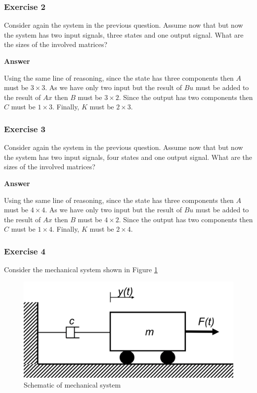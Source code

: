 \subsubsection{Exercise 2}

Consider again the system in the previous  question. Assume now that but now the system has two input signals, three states and one output signal. What are the sizes of the involved matrices?

\textbf{Answer}

Using the same line of reasoning, since the state has three components then $A$ must be $3\times 3$. As we have only two input but the result of $Bu$ must be added to the result of $Ax$ then $B$ must be $3\times 2$. Since the output has two components then $C$ must be $1\times 3$. Finally, $K$ must be $2\times 3$.

\subsubsection{Exercise 3}

Consider again the system in the previous  question. Assume now that but now the system has two input signals, four states and one output signal. What are the sizes of the involved matrices?

\textbf{Answer}

Using the same line of reasoning, since the state has three components then $A$ must be $4\times 4$. As we have only two input but the result of $Bu$ must be added to the result of $Ax$ then $B$ must be $4\times 2$. Since the output has two components then $C$ must be $1\times 4$. Finally, $K$ must be $2\times 4$.

\subsubsection{Exercise 4}

Consider the mechanical system shown in Figure \ref{Mechanical_system_3_1_1_ex_4} 

\begin{figure}[!htb]
\begin{center}
\includegraphics[scale=0.280]{img/state_feedback/Mechanical_system_3_1_1_ex_4.png}
\end{center}
\caption{Schematic of mechanical system}
\label{Mechanical_system_3_1_1_ex_4}
\end{figure}

